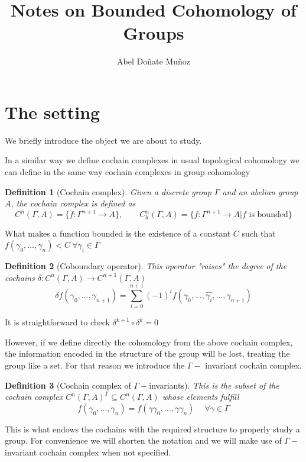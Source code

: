 \documentclass[leqno]{article}
\title{Notes on Bounded Cohomology of Groups}
\author{Abel Doñate Muñoz}
\date{}
\newtheorem*{definition}{Definition}
\begin{document}
\maketitle
\tableofcontents
\newpage

\section{The setting}
We briefly introduce the object we are about to study.

In a similar way we define cochain complexes in usual topological cohomology we can define in the same way cochain complexes in group cohomology

\begin{definition}[Cochain complex] Given a discrete group $\Gamma $ and an abelian group $A$, the cochain complex is defined as
\[
  C^n(\Gamma , A) = \{f: \Gamma ^{n+1}\to A\} , \qquad C^n_{b} (\Gamma , A) = \{f:\Gamma ^{n+1}\to  A | f \text{ is bounded}\}
\] 
\end{definition}

What makes a function bounded is the existence of a constant $C$ such that  $f(\gamma_0, \ldots, \gamma_n)<C \ \forall \gamma_i\in \Gamma $

\begin{definition}[Coboundary operator] This operator "raises" the degree of the cochains $\delta: C^n(\Gamma , A)\to  C^{n+1}(\Gamma , A)$
\[
  \delta f(\gamma_0,\ldots, \gamma_{n+1}) = \sum_{i=0}^{n+1} (-1)^{i}f(\gamma_0, \ldots, \hat{\gamma_i}, \ldots, \gamma_{n+1})
\] 
\end{definition}

It is straightforward to check $\delta^{k+1} \circ \delta^k = 0$

However, if we define directly the cohomology from the above cochain complex, the information encoded in the structure of the group will be lost, treating the group like a set. For that reason we introduce the $\Gamma -$ invariant cochain complex.

\begin{definition}[Cochain complex of $\Gamma -$invariants] This is the subset of the cochain complex $C^n(\Gamma , A)^\Gamma \subseteq C^n(\Gamma , A)$ whose elements fulfill
  \[
  f(\gamma_0,\ldots, \gamma_n) = f(\gamma\gamma_0,\ldots, \gamma\gamma_n) \quad \ \forall \gamma \in \Gamma 
  \] 
\end{definition}
This is what endows the cochains with the required structure to properly study a group. For convenience we will shorten the notation and we will make use of $\Gamma -$invariant cochain complex when not specified.
\end{document}
